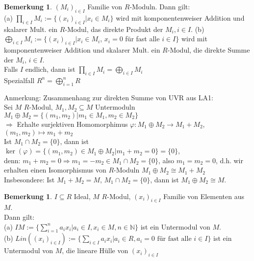 \documentclass[10pt,a4paper,numbers=endperiod]{scrartcl}
\theoremstyle{definition}
\newtheorem{bem}[satz]{Bemerkung}
\def\NN{{\mathbb N}}
\begin{document}
\begin{bem}
	$(M_i)_{i \in I}$ Familie von $R$-Moduln. Dann gilt:\\
	(a) $\prod\limits_{i \in I} M_i := \{(x_i)_{i \in I}| x_i \in M_i\}$ wird mit komponentenweiser Addition und skalarer Mult. ein $R$-Modul, das direkte Produkt der $M_i, i \in I$.
		(b) $\bigoplus\limits_{i \in I} M_i := \{(x_i)_{i \in I}| x_i \in M_i$, $x_i = 0$ für fast alle $i \in I\}$ wird mit komponentenweiser Addition und skalarer Mult. ein $R$-Modul, die direkte Summe der $M_i$, $i \in I$.\\
	Falls $I$ endlich, dann ist $\prod\limits_{i \in I} M_i = \bigoplus\limits_{i \in I} M_i$\\
	Spezialfall $R^n = \bigoplus\limits_{i = 1}^{n} R$
\end{bem}

Anmerkung: Zusammenhang zur direkten Summe von UVR aus LA1:\\
Sei $M$ $R$-Modul, $M_1, M_2 \subseteq M$ Untermoduln\\
$M_1 \oplus M_2 = \{(m_1, m_2) | m_1 \in M_1, m_2 \in M_2\}$\\
$\Rightarrow$ Erhalte surjektiven Homomorphimus $\varphi: M_1 \oplus M_2 \rightarrow M_1 + M_2$, $(m_1, m_2) \mapsto m_1 + m_2$\\
Ist $M_1 \cap M_2 = \{0\}$, dann ist $\ker(\varphi) = \{(m_1, m_2) \in M_1 \oplus M_2| m_1 + m_2 = 0\} = \{0\}$,\\
denn: $m_1 + m_2 = 0 \Rightarrow m_1 = -m_2 \in M_1 \cap M_2 = \{0\}$, also $m_1 = m_2 = 0$, d.h. wir erhalten einen Isomorphismus von $R$-Moduln $M_1 \oplus M_2 \cong M_1 + M_2$\\
Insbesondere: Ist $M_1 + M_2 = M$, $M_1 \cap M_2 = \{0\}$, dann ist $M_1 \oplus M_2 \cong M$.

\begin{bem}
	$I \subseteq R$ Ideal, $M$ $R$-Modul, $(x_i)_{i \in I}$ Familie von Elementen aus $M$.\\
	Dann gilt:\\
	(a) $IM := \{\sum\limits_{i = 1}^{n} a_ix_i| a_i \in I, x_i \in M, n \in \NN\}$ ist ein Untermodul von $M$.\\
	(b) $Lin((x_i)_{i \in I}) := \{ \sum\limits_{i \in I} a_ix_i| a_i \in R, a_i = 0 \text{ für fast alle } i \in I\}$ ist ein Untermodul von $M$, die lineare Hülle von $(x_i)_{i \in I}$
\end{bem}
\end{document}
